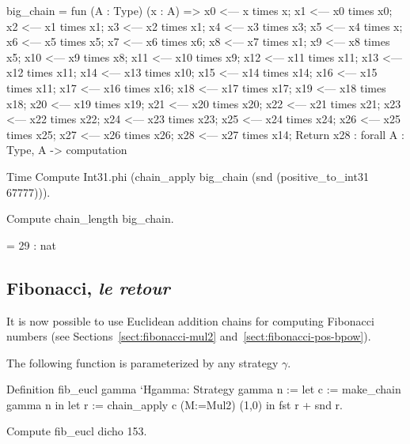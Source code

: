 \begin{Coqanswer}
big_chain = 
fun (A : Type) (x : A) =>
x0 <--- x times x; x1 <--- x0 times x0;
x2 <--- x1 times x1; x3 <--- x2 times x1;
x4 <--- x3 times x3; x5 <--- x4 times x;
x6 <--- x5 times x5; x7 <--- x6 times x6;
x8 <--- x7 times x1; x9 <--- x8 times x5;
x10 <--- x9 times x8; x11 <--- x10 times x9;
x12 <--- x11 times x11; x13 <--- x12 times x11;
x14 <--- x13 times x10; x15 <--- x14 times x14;
x16 <--- x15 times x11; x17 <--- x16 times x16;
x18 <--- x17 times x17; x19 <--- x18 times x18;
x20 <--- x19 times x19; x21 <--- x20 times x20;
x22 <--- x21 times x21; x23 <--- x22 times x22;
x24 <--- x23 times x23; x25 <--- x24 times x24; 
x26 <--- x25 times x25; x27 <--- x26 times x26; 
x28 <--- x27 times x14;  Return x28
     : forall A : Type, A -> computation

\end{Coqanswer}

\begin{Coqsrc}
Time   Compute  Int31.phi 
     (chain_apply big_chain (snd (positive_to_int31  67777))).
\end{Coqsrc}
\begin{Coqanswer}
= 2014111041%
     : Z
Finished transaction in 0.005 secs (0.005u,0.s) (successful)}  
\end{Coqanswer}

\begin{Coqsrc}
Compute chain_length big_chain.
\end{Coqsrc}

\begin{Coqanswer}
= 29%
     : nat  
\end{Coqanswer}



\subsection{Fibonacci, \emph{le retour}}
\label{sect:fibonacci-euclidean}

It is now possible to use Euclidean addition chains for computing Fibonacci numbers
(see Sections~\vref{sect:fibonacci-mul2} and~\vref{sect:fibonacci-pos-bpow}).

The following function is parameterized by any strategy $\gamma$.

\begin{Coqsrc}
Definition fib_eucl gamma `{Hgamma: Strategy gamma} n :=
  let c := make_chain gamma  n
  in let r := chain_apply c (M:=Mul2) (1,0) in
       fst r + snd r.

Compute fib_eucl dicho 153.
\end{Coqsrc}

